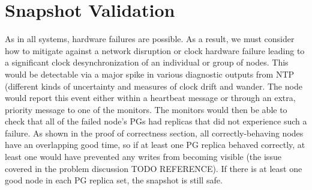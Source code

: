 \section{Snapshot Validation}

As in all systems, hardware failures are possible. As a result, we
must consider how to mitigate against a network disruption or clock
hardware failure leading to a significant clock desynchronization of
an individual or group of nodes. This would be detectable via a major
spike in various diagnostic outputs from NTP (different kinds of
uncertainty and measures of clock drift and wander. %
The node would report this event either within a heartbeat message or
through an extra, priority message to one of the monitors. The
monitors would then be able to check that all of the failed node's PGs
had replicas that did not experience such a failure. As shown in the
proof of correctness section, all correctly-behaving nodes have an
overlapping good time, so if at least one PG replica behaved
correctly, at least one would have prevented any writes from becoming
visible (the issue covered in the problem discussion TODO
REFERENCE). If there is at least one good node in each PG replica set,
the snapshot is still safe.

